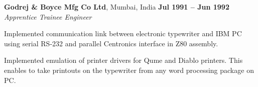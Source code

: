 \documentclass[margin,line]{resume}
\begin{document}
\begin{resume}
    \textbf{Godrej \& Boyce Mfg Co Ltd}, Mumbai, India \hfill \textbf{Jul 1991 -- Jun 1992}\\
    \textsl{Apprentice Trainee Engineer}\\ 
    \begin{list2}
    \item Implemented communication link between electronic typewriter and IBM PC using serial RS-232 and parallel Centronics interface in Z80 assembly.
    \item Implemented emulation of printer drivers for Qume and Diablo printers. This enables to take printouts on the typewriter from any word processing package on PC.
    \end{list2}\vspace{-1.5mm}

\end{resume}
\end{document}
